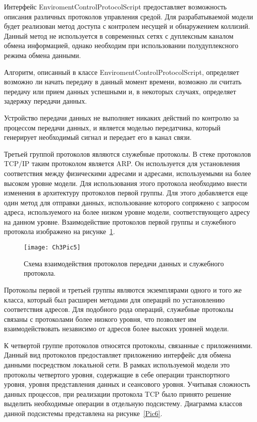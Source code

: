    Интерфейс EnviromentControlProtocolScript предоставляет возможность описания различных протоколов управления средой. Для разрабатываемой модели будет реализован метод доступа с контролем несущей и обнаружением коллизий. Данный метод не используется в современных сетях с дуплексным каналом обмена информацией, однако необходим при использовании полудуплексного режима обмена данными.

    Алгоритм, описанный в классе EnviromentControlProtocolScript, определяет возможно ли начать передачу в данный момент времени, возможно ли считать передачу или прием данных успешными и, в некоторых случаях, определяет задержку передачи данных.

    Устройство передачи данных не выполняет никаких действий по контролю за процессом передачи данных, и является моделью передатчика, который генерирует необходимый сигнал и передает его в канал связи.

    Третьей группой протоколов являются служебные протоколы. В стеке протоколов TCP/IP таким протоколом является ARP. Он используется для установления соответствия между физическими адресами и адресами, используемыми на более высоком уровне модели. Для использования этого протокола необходимо внести изменения в архитектуру протоколов первой группы. Для этого добавляется еще один метод для отправки данных, использование которого сопряжено с запросом адреса, используемого на более низком уровне модели, соответствующего адресу на данном уровне. Взаимодействие протоколов первой группы и служебного протокола изображено на рисунке~\ref{Pic5}.

    \begin{figure}[h!]\center
        \texttt{[image: Ch3Pic5]}
        \caption{Схема взаимодействия протоколов передачи данных и служебного протокола. } \label{Pic5}
    \end{figure}

    Протоколы первой и третьей группы являются экземплярами одного и того же класса, который был расширен методами для операций по установлению соответствия адресов. Для подобного рода операций, служебные протоколы связаны с протоколами более низкого уровня, что позволяет им взаимодействовать независимо от адресов более высоких уровней модели.

    К четвертой группе протоколов относятся протоколы, связанные с приложениями. Данный вид протоколов предоставляет приложению интерфейс для обмена данными посредством локальной сети. В рамках используемой модели это протоколы четвертого уровня, содержащие в себе операции транспортного уровня, уровня представления данных и сеансового уровня. Учитывая сложность данных процессов, при реализации протокола TCP было принято решение выделить необходимые операции в отдельную подсистему. Диаграмма классов данной подсистемы представлена на рисунке~\ref{Pic6}.

